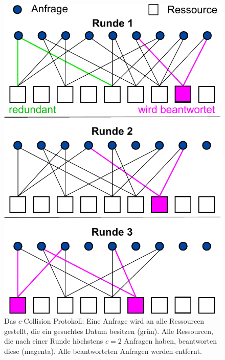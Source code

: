 \begin{figure}
  \centering
  \includegraphics[scale=0.55]{images/ccollision2.pdf}
  \caption{\label{fig:relwork:ccollision} Das $c$-Collision Protokoll: Eine Anfrage wird an alle Ressourcen gestellt, die ein gesuchtes Datum besitzen (grün). Alle Ressourcen, die nach einer Runde höchstens $c=2$ Anfragen haben, beantworten diese (magenta). Alle beantworteten Anfragen werden entfernt.}\phantom{\;\;\;\;\;\;\;\;\;\;\;\;\;\;\;\;\;\;\;\;\;\;}
\end{figure}

